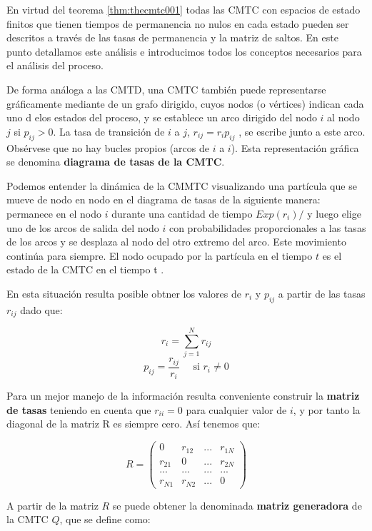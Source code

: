 \documentclass[
]{book}
\theoremstyle{definition}
\theoremstyle{definition}
\theoremstyle{definition}
\theoremstyle{definition}
\theoremstyle{remark}
\begin{document}
En virtud del teorema \ref{thm:thecmtc001} todas las CMTC con espacios de estado finitos que tienen
tiempos de permanencia no nulos en cada estado pueden ser descritos a través de las tasas de permanencia y la matriz de saltos. En este punto detallamos este análisis e introducimos todos los conceptos necesarios para el análisis del proceso.

De forma análoga a las CMTD, una CMTC también puede representarse gráficamente mediante de un grafo dirigido, cuyos nodos (o vértices) indican cada uno d elos estados del proceso, y se establece un arco dirigido del nodo \(i\) al nodo \(j\) si \(p_{ij} > 0\). La tasa de transición de \(i\) a \(j\), \(r_{ij} = r_i p_{ij}\) , se escribe junto a este arco. Obsérvese que no hay bucles propios (arcos de \(i\) a \(i\)). Esta representación gráfica se denomina \textbf{diagrama de tasas de la CMTC}.

Podemos entender la dinámica de la CMMTC visualizando una partícula que se mueve de nodo en nodo en el diagrama de tasas de la siguiente manera: permanece en el nodo \(i\) durante una cantidad de tiempo \(Exp(r_i)/\) y luego elige uno de los arcos de salida del nodo \(i\) con probabilidades proporcionales a las tasas de los arcos y se desplaza al nodo del otro extremo del arco. Este movimiento continúa para siempre. El nodo ocupado por la partícula en el tiempo \(t\) es el estado de la CMTC en el tiempo t .

En esta situación resulta posible obtner los valores de \(r_i\) y \(p_{ij}\) a partir de las tasas \(r_{ij}\) dado que:

\[r_i = \sum_{j=1}^{N} r_{ij}\]
\[p_{ij} = \frac{r_{ij}}{r_i} \quad \text{ si } r_i \neq 0\]

Para un mejor manejo de la información resulta conveniente construir la \textbf{matriz de tasas} teniendo en cuenta que \(r_{ii} = 0\) para cualquier valor de \(i\), y por tanto la diagonal de la matriz R es siempre cero. Así tenemos que:

\[R = 
\begin{pmatrix}
0 & r_{12} & ... & r_{1N}\\
r_{21} & 0 & ... & r_{2N}\\
... & ... & ... & ...\\
r_{N1} & r_{N2} & ... & 0
\end{pmatrix}\]

A partir de la matriz \(R\) se puede obtener la denominada \textbf{matriz generadora} de la CMTC \(Q\), que se define como:
\end{document}

